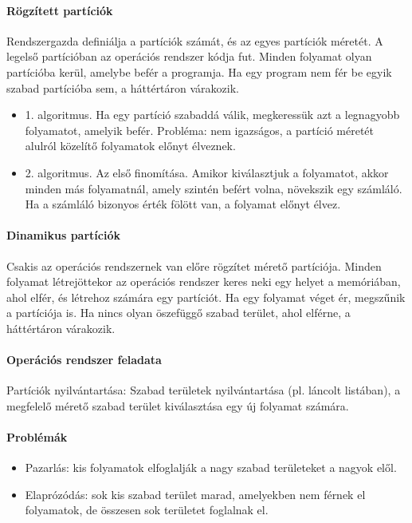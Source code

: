\documentclass[fleqn,10pt,a4paper]{article}
\theoremstyle{magyar}
\begin{document}
  \paragraph{Rögzített partíciók}
  Rendszergazda definiálja a partíciók számát, és az egyes partíciók méretét. A legelső partícióban az operációs
  rendszer kódja fut. Minden folyamat olyan partícióba kerül, amelybe befér a programja. Ha egy program nem fér be egyik
  szabad partícióba sem, a háttértáron várakozik.
  
  \begin{itemize}
  \item 1. algoritmus. Ha egy partíció szabaddá válik, megkeressük azt a legnagyobb folyamatot, amelyik befér. Probléma:
    nem igazságos, a partíció méretét alulról közelítő folyamatok előnyt élveznek.
  \item 2. algoritmus. Az első finomítása. Amikor kiválasztjuk a folyamatot, akkor minden más folyamatnál, amely
    szintén befért volna, növekszik egy számláló. Ha a számláló bizonyos érték fölött van, a folyamat előnyt élvez.
  \end{itemize}
  
  \paragraph{Dinamikus partíciók}
  Csakis az operációs rendszernek van előre rögzítet mérető partíciója. Minden folyamat létrejöttekor az operációs
  rendszer keres neki egy helyet a memóriában, ahol elfér, és létrehoz számára egy partíciót. Ha egy folyamat véget ér,
  megszűnik a partíciója is. Ha nincs olyan öszefüggő szabad terület, ahol elférne, a háttértáron várakozik.

  \paragraph{Operációs rendszer feladata}
  Partíciók nyilvántartása: Szabad területek nyilvántartása (pl. láncolt listában), a megfelelő mérető szabad terület
  kiválasztása egy új folyamat számára.
  
  \paragraph{Problémák}
  \begin{itemize}
  \item Pazarlás: kis folyamatok elfoglalják a nagy szabad területeket a nagyok elől.
  \item Elaprózódás: sok kis szabad
    terület marad, amelyekben nem férnek el folyamatok, de összesen sok területet foglalnak el.
  \end{itemize}
\end{document}
